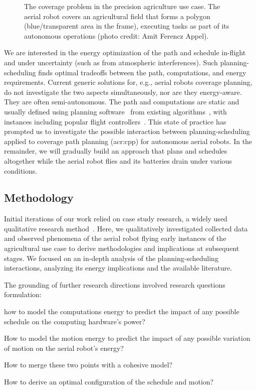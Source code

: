\begin{figure}[ht!]
  \centering
  
  \caption[The coverage problem in a precision agriculture use case]{The coverage problem in the precision agriculture use case. The aerial robot covers an agricultural field that forms a polygon (blue/transparent area in the frame), executing tasks as part of its autonomous operations {\scriptsize(photo credit: Amit Ferencz Appel)}.}
  \label{fig:plot2}
\end{figure}
We are interested in the energy optimization of the path and schedule in-flight and under uncertainty (such as from atmospheric interferences). Such planning-scheduling finds optimal tradeoffs between the path, computations, and energy requirements. Current generic solutions for, e.g., aerial robots coverage planning, do not investigate the two aspects simultaneously, nor are they energy-aware. They are often semi-autonomous. The path and computations are static and usually defined using planning software~\citep{daponte2019review} from existing algorithms~\citep{choset2001coverage,galceran2013survey}, with instances including popular flight controllers~\citep{px4,papa}. This state of practice has prompted us to investigate the possible interaction between planning-scheduling applied to coverage path planning (\Gls{acr:cpp}) for autonomous aerial robots. In the remainder, we will gradually build an approach that plans and schedules altogether while the aerial robot flies and its batteries drain under various conditions.

\subsection{Methodology}
\label{sec:methodology}

Initial iterations of our work relied on case study research, a widely used qualitative research method~\citep{darke1998successfully}. Here, we qualitatively investigated collected data and observed phenomena of the aerial robot flying early instances of the agricultural use case to derive methodologies and implications at subsequent stages. We focused on an in-depth analysis of the planning-scheduling interactions, analyzing its energy implications and the available literature. 

The grounding of further research directions involved research questions formulation: 
\begin{enumerate*}[label={(\alph*)},font={\textit}]
  \item how to model the computations energy to predict the impact of any possible schedule on the computing hardware's power? 
  \item How to model the motion energy to predict the impact of any possible variation of motion on the aerial robot's energy? 
  \item How to merge these two points with a cohesive model? 
  \item How to derive an optimal configuration of the schedule and motion?
\end{enumerate*} 

